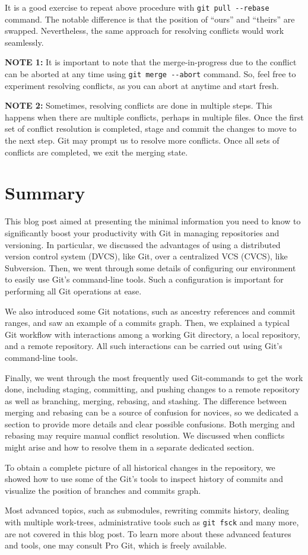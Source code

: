 \documentclass[11pt]{article}
\begin{document}
It is a good exercise to repeat above procedure with \texttt{git pull -{}-rebase} command. The notable difference is that the position of ``ours'' and ``theirs'' are swapped. Nevertheless, the same approach for resolving conflicts would work seamlessly.

\textbf{NOTE 1:} It is important to note that the merge-in-progress due to the conflict can be aborted at any time using \texttt{git merge -{}-abort} command. So, feel free to experiment resolving conflicts, as you can abort at anytime and start fresh.

\textbf{NOTE 2:} Sometimes, resolving conflicts are done in multiple steps. This happens when there are multiple conflicts, perhaps in multiple files. Once the first set of conflict resolution is completed, stage and commit the changes to move to the next step. Git may prompt us to resolve more conflicts. Once all sets of conflicts are completed, we exit the merging state.





\section{Summary}
\label{sec:orgheadline21}
This blog post aimed at presenting the minimal information you need to know to significantly boost your productivity with Git in managing repositories and versioning. In particular, we discussed the advantages of using a distributed version control system (DVCS), like Git, over a centralized VCS (CVCS), like Subversion. Then, we went through some details of configuring our environment to easily use Git's command-line tools. Such a configuration is important for performing all Git operations at ease.

We also introduced some Git notations, such as ancestry references and commit ranges, and saw an example of a commits graph. Then, we explained a typical Git workflow with interactions among a working Git directory, a local repository, and a remote repository. All such interactions can be carried out using Git's command-line tools.

Finally, we went through the most frequently used Git-commands to get the work done, including staging, committing, and pushing changes to a remote repository as well as branching, merging, rebasing, and stashing. The difference between merging and rebasing can be a source of confusion for novices, so we dedicated a section to provide more details and clear possible confusions. Both merging and rebasing may require manual conflict resolution. We discussed when conflicts might arise and how to resolve them in a separate dedicated section.

To obtain a complete picture of all historical changes in the repository, we showed how to use some of the Git's tools to inspect history of commits and visualize the position of branches and commits graph.

Most advanced topics, such as submodules, rewriting commits history, dealing with multiple work-trees, administrative tools such as \texttt{git fsck} and many more, are not covered in this blog post. To learn more about these advanced features and tools, one may consult Pro Git, which is freely available.
\end{document}
